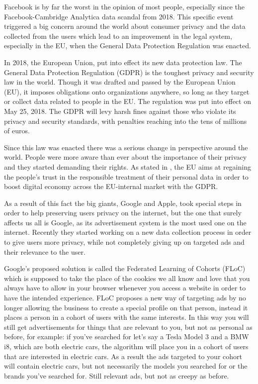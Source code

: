 Facebook is by far the worst in the opinion of most people, especially since the Facebook-Cambridge Analytica data scandal from 2018. This specific event triggered a big concern around the world about consumer privacy and the data collected from the users which lead to an improvement in the legal system, especially in the EU, when the General Data Protection Regulation was enacted.

In 2018, the European Union, put into effect its new data protection law. The General Data Protection Regulation (GDPR) is the toughest privacy and security law in the world. Though it was drafted and passed by the European Union (EU), it imposes obligations onto organizations anywhere, so long as they target or collect data related to people in the EU. The regulation was put into effect on May 25, 2018. The GDPR will levy harsh fines against those who violate its privacy and security standards, with penalties reaching into the tens of millions of euros. \cite{whatIsGDPR}

Since this law was enacted there was a serious change in perspective around the world. People were more aware than ever about the importance of their privacy and they started demanding their rights. As stated in \cite{voigt2017eu}, the EU aims at regaining the people’s trust in the responsible treatment of their personal data in order to boost digital economy across the EU-internal market with the GDPR.

As a result of this fact the big giants, Google and Apple, took special steps in order to help preserving users privacy on the internet, but the one that surely affects us all is Google, as its advertisement system is the most used one on the internet. Recently they started working on a new data collection process in order to give users more privacy, while not completely giving up on targeted ads and their relevance to the user.

Google's proposed solution is called the Federated Learning of Cohorts (FLoC) which is supposed to take the place of the cookies we all know and love that you always have to allow in your browser whenever you access a website in order to have the intended experience. FLoC proposes a new way of targeting ads by no longer allowing the business to create a special profile on that person, instead it places a person in a cohort of users with the same interests. In this way you will still get advertisements for things that are relevant to you, but not as personal as before, for example:
if you've searched for let's say a Tesla Model 3 and a BMW i8, which are both electric cars, the algorithm will place you in a cohort of users that are interested in electric cars. As a result the ads targeted to your cohort will contain electric cars, but not necessarily the models you searched for or the brands you've searched for. Still relevant ads, but not as creepy as before.

